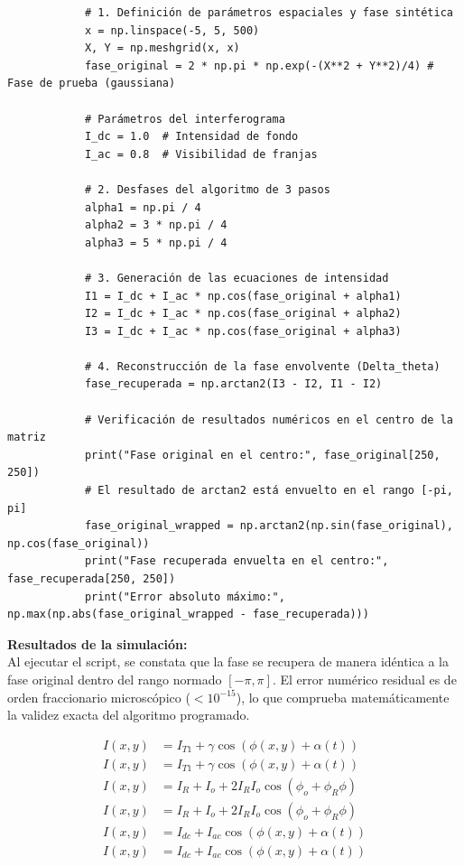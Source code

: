 \documentclass[12pt,letterpaper]{article}
\begin{document}
\begin{enumerate}
\begin{verbatim}
			# 1. Definición de parámetros espaciales y fase sintética
			x = np.linspace(-5, 5, 500)
			X, Y = np.meshgrid(x, x)
			fase_original = 2 * np.pi * np.exp(-(X**2 + Y**2)/4) # Fase de prueba (gaussiana)
			
			# Parámetros del interferograma
			I_dc = 1.0  # Intensidad de fondo
			I_ac = 0.8  # Visibilidad de franjas
			
			# 2. Desfases del algoritmo de 3 pasos
			alpha1 = np.pi / 4
			alpha2 = 3 * np.pi / 4
			alpha3 = 5 * np.pi / 4
			
			# 3. Generación de las ecuaciones de intensidad
			I1 = I_dc + I_ac * np.cos(fase_original + alpha1)
			I2 = I_dc + I_ac * np.cos(fase_original + alpha2)
			I3 = I_dc + I_ac * np.cos(fase_original + alpha3)
			
			# 4. Reconstrucción de la fase envolvente (Delta_theta)
			fase_recuperada = np.arctan2(I3 - I2, I1 - I2)
			
			# Verificación de resultados numéricos en el centro de la matriz
			print("Fase original en el centro:", fase_original[250, 250])
			# El resultado de arctan2 está envuelto en el rango [-pi, pi]
			fase_original_wrapped = np.arctan2(np.sin(fase_original), np.cos(fase_original))
			print("Fase recuperada envuelta en el centro:", fase_recuperada[250, 250])
			print("Error absoluto máximo:", np.max(np.abs(fase_original_wrapped - fase_recuperada)))
		\end{verbatim}
		
		\textbf{Resultados de la simulación:} \\
		Al ejecutar el script, se constata que la fase se recupera de manera idéntica a la fase original dentro del rango normado $[-\pi, \pi]$. El error numérico residual es de orden fraccionario microscópico ($<10^{-15}$), lo que comprueba matemáticamente la validez exacta del algoritmo programado.
		\vspace{0.5cm}
		
		\begin{align*}
			I(x,y) &= I_{T1} + \gamma \cos(\phi(x,y) + \alpha(t)) \\
			I(x,y) &= I_{T1} + \gamma \cos(\phi(x,y) + \alpha(t)) \\
			I(x,y) &= I_R + I_o + 2 I_R I_o \cos(\phi_o + \phi_R \phi) \\
			I(x,y) &= I_R + I_o + 2 I_R I_o \cos(\phi_o + \phi_R \phi) \\
			I(x,y) &= I_{dc} + I_{ac} \cos(\phi(x,y) + \alpha(t)) \\
			I(x,y) &= I_{dc} + I_{ac} \cos(\phi(x,y) + \alpha(t))
		\end{align*}
		\vspace{0.5cm}
		

\end{enumerate}
\end{document}

